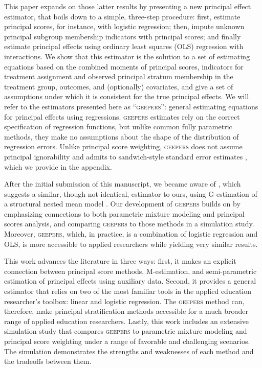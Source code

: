 \documentclass[]{article}
\begin{document}
This paper expands on those latter results by presenting a new principal effect estimator, that boils down to a simple, three-step procedure: first, estimate principal scores, for instance, with logistic regression; then, impute unknown principal subgroup membership indicators with principal scores; and finally estimate principal effects using ordinary least squares (OLS) regression with interactions. %
We show that this estimator is the solution to a set of estimating equations based on the combined moments of principal scores, indicators for treatment assignment and observed principal stratum membership in the treatment group, outcomes, and (optionally) covariates, and give a set of assumptions under which it is consistent for the true principal effects.
We will refer to the estimators presented here as ``\textsc{geepers}'': general estimating equations for principal effects using regressions.
\textsc{geepers} estimates rely on the correct specification of regression functions, but unlike common fully parametric methods, they make no assumptions about the shape of the distribution of regression errors.
Unlike principal score weighting, \textsc{geepers} does not assume principal ignorability and admits to sandwich-style standard error estimates \citep{stefanskiBoos}, which we provide in the appendix.

After the initial submission of this manuscript, we became aware of \citet{richardson2023estimating}, which suggests a similar, though not identical, estimator to ours, using G-estimation of a structural nested mean model \citep[e.g.][]{wallace2017r}.
Our development of \textsc{geepers} builds on \citet{richardson2023estimating} by emphasizing connections to both parametric mixture modeling and principal scores analysis, and comparing \textsc{geepers} to those methods in a simulation study.
Moreover, \textsc{geepers}, which, in practice, is a combination of logistic regression and OLS, is more accessible to applied researchers while yielding very similar results.
 
This work advances the literature in three ways: first, it makes an explicit connection between principal score methods, M-estimation, and semi-parametric estimation of principal effects using auxiliary data. Second, it provides a general estimator that relies on two of the most familiar tools in the applied education researcher's toolbox: linear and logistic regression. The \textsc{geepers} method can, therefore, make principal stratification methods accessible for a much broader range of applied education researchers. Lastly, this work includes an extensive simulation study that compares \textsc{geepers} to parametric mixture modeling and principal score weighting under a range of favorable and challenging scenarios. The simulation demonstrates the strengths and weaknesses of each method and the tradeoffs between them.
\end{document}
